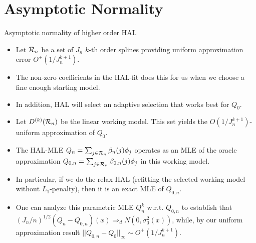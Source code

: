 \documentclass[t]{beamer}
\newlength{\wideitemsep}
\let\olditem\item
\renewcommand{\item}{\setlength{\itemsep}{\wideitemsep}\olditem}
\begin{document}
 \section{Asymptotic Normality}
\begin{frame}{Asymptotic normality of higher order HAL}
\begin{itemize}
\item Let ${\cal R}_n$ be a set of $J_n$ $k$-th order splines  providing uniform approximation error $O^+(1/J_n^{k+1})$.
\item The non-zero coefficients in the HAL-fit  does this for us when we choose a fine enough starting model.
\item In addition, HAL will select an adaptive selection that works best for $Q_0$.
\item Let $D^{(k)}({\cal R}_n)$ be the linear working model. This set yields the $O(1/J_n^{k+1})$-uniform approximation of $Q_0$.
 \item The HAL-MLE $Q_n=\sum_{j\in {\cal R}_n}\beta_n(j)\phi_j$ operates as an MLE of the oracle approximation $Q_{0,n}=\sum_{j\in {\cal R}_n}\beta_{0,n}(j)\phi_j$ in this working model.
 \end{itemize}
 \end{frame}
 \begin{frame}
 \begin{itemize}
 \item In particular, if we do the relax-HAL (refitting the selected working model without $L_1$-penalty), then it is an exact MLE of $Q_{0,n}$.
 \item One can analyze this parametric MLE $Q_n^k$ w.r.t. $Q_{0,n}$ to establish that  $(J_n/n)^{1/2}(Q_n-Q_{0,n})(x)\Rightarrow_d N(0,\sigma^2_0(x))$, while, by our uniform approximation result $|| Q_{0,n}-Q_0 ||_{\infty}\sim O^+(1/J_n^{k+1})$.
 \end{itemize}
 \end{frame}
\end{document}
